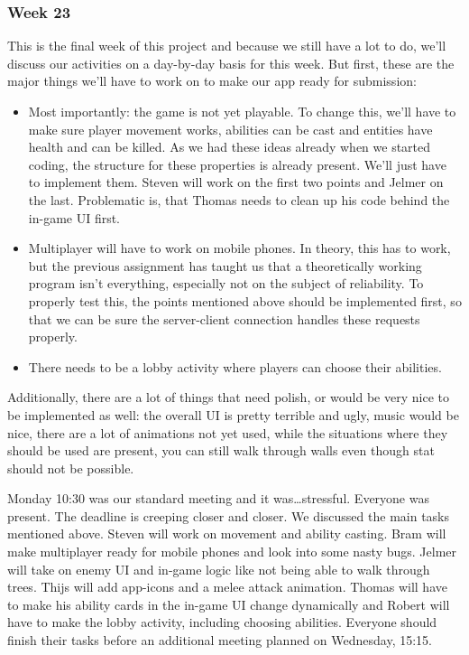 \documentclass[../main.tex]{subfiles}
\begin{document}
\subsubsection*{Week 23}
This is the final week of this project and because we still have a lot to do, we'll discuss our activities on a day-by-day basis for this week. But first, these are the major things we'll have to work on to make our app ready for submission:
\begin{itemize}
	\item Most importantly: the game is not yet playable. To change this, we'll have to make sure player movement works, abilities can be cast and entities have health and can be killed. As we had these ideas already when we started coding, the structure for these properties is already present. We'll just have to implement them. Steven will work on the first two points and Jelmer on the last. Problematic is, that Thomas needs to clean up his code behind the in-game UI first.
	\item Multiplayer will have to work on mobile phones. In theory, this has to work, but the previous assignment has taught us that a theoretically working program isn't everything, especially not on the subject of reliability. To properly test this, the points mentioned above should be implemented first, so that we can be sure the server-client connection handles these requests properly.
	\item There needs to be a lobby activity where players can choose their abilities.
\end{itemize}
Additionally, there are a lot of things that need polish, or would be very nice to be implemented as well: the overall UI is pretty terrible and ugly, music would be nice, there are a lot of animations not yet used, while the situations where they should be used are present, you can still walk through walls even though stat should not be possible.

Monday 10:30 was our standard meeting and it was\dots stressful. Everyone was present. The deadline is creeping closer and closer. We discussed the main tasks mentioned above. Steven will work on movement and ability casting. Bram will make multiplayer ready for mobile phones and look into some nasty bugs. Jelmer will take on enemy UI and in-game logic like not being able to walk through trees. Thijs will add app-icons and a melee attack animation. Thomas will have to make his ability cards in the in-game UI change dynamically and Robert will have to make the lobby activity, including choosing abilities. Everyone should finish their tasks before an additional meeting planned on Wednesday, 15:15.
\end{document}
